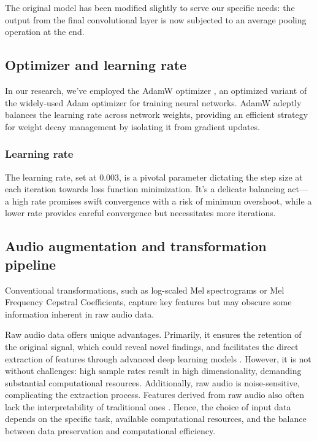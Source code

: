 The original model has been modified slightly to serve our specific needs: the output from the final convolutional layer is now subjected to an average pooling operation at the end.



\subsection{Optimizer and learning rate}

In our research, we've employed the AdamW optimizer \cite{Loshchilov2017DecoupledRegularization}, an optimized variant of the widely-used Adam optimizer for training neural networks. AdamW adeptly balances the learning rate across network weights, providing an efficient strategy for weight decay management by isolating it from gradient updates. 

\subsubsection{Learning rate}

The learning rate, set at 0.003, is a pivotal parameter dictating the step size at each iteration towards loss function minimization. It's a delicate balancing act— a high rate promises swift convergence with a risk of minimum overshoot, while a lower rate provides careful convergence but necessitates more iterations.


\subsection{Audio augmentation and transformation pipeline}

Conventional transformations, such as log-scaled Mel spectrograms or Mel Frequency Cepstral Coefficients, capture key features but may obscure some information inherent in raw audio data.

Raw audio data offers unique advantages. Primarily, it ensures the retention of the original signal, which could reveal novel findings, and facilitates the direct extraction of features through advanced deep learning models \cite{learning}. However, it is not without challenges: high sample rates result in high dimensionality, demanding substantial computational resources. Additionally, raw audio is noise-sensitive, complicating the extraction process. Features derived from raw audio also often lack the interpretability of traditional ones \cite{Schindler2020DeepTutorial}. Hence, the choice of input data depends on the specific task, available computational resources, and the balance between data preservation and computational efficiency.

